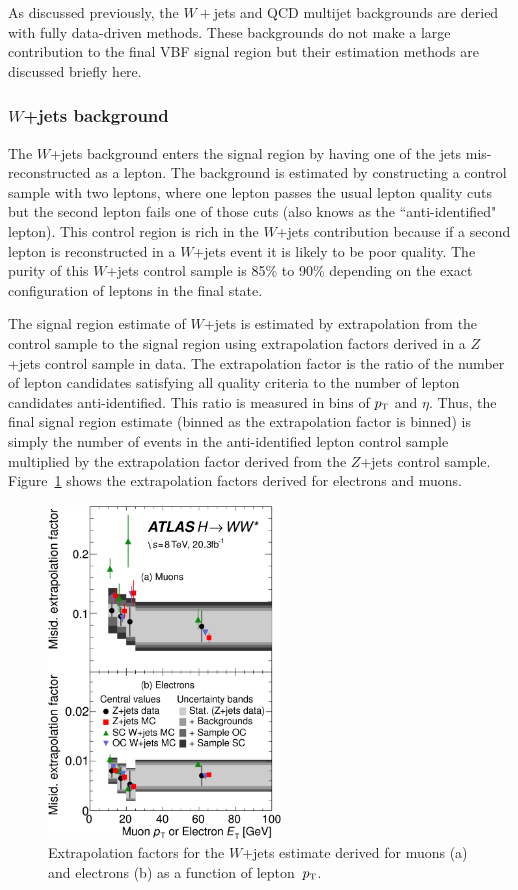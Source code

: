 As discussed previously, the $W+$jets and QCD multijet backgrounds are deried with fully data-driven methods. These backgrounds do not make a large contribution to the final VBF signal region but their estimation methods are discussed briefly here.

\subsubsection{$W$+jets background}

The $W$+jets background enters the signal region by having one of the jets mis-reconstructed as a lepton. The background is estimated by constructing a control sample with two leptons, where one lepton passes the usual lepton quality cuts but the second lepton fails one of those cuts (also knows as the ``anti-identified" lepton). This control region is rich in the $W$+jets contribution because if a second lepton is reconstructed in a $W$+jets event it is likely to be poor quality. The purity of this $W$+jets control sample is 85\% to 90\% depending on the exact configuration of leptons in the final state.

The signal region estimate of $W$+jets is estimated by extrapolation from the control sample to the signal region using extrapolation factors derived in a $Z$+jets control sample in data. The extrapolation factor is the ratio of the number of lepton candidates satisfying all quality criteria to the number of lepton candidates anti-identified. This ratio is measured in bins of $p_{\textrm{\footnotesize\sc t}}$ and $\eta$. Thus, the final signal region estimate (binned as the extrapolation factor is binned) is simply the number of events in the anti-identified lepton control sample multiplied by the extrapolation factor derived from the $Z$+jets control sample. Figure~\ref{fig:VBF_extrap_Wjets} shows the extrapolation factors derived for electrons and muons. 

\begin{figure}[h!]
  \centering
  \captionsetup{justification=centering}
  \includegraphics[width=0.55\textwidth]{figures/VBF_Wjets_extrap}
  \caption{Extrapolation factors for the $W$+jets estimate derived for muons (a) and electrons (b) as a function of lepton~$p_{\textrm{\footnotesize\sc t}}$\cite{WW2015}.}
  \label{fig:VBF_extrap_Wjets}
\end{figure}

